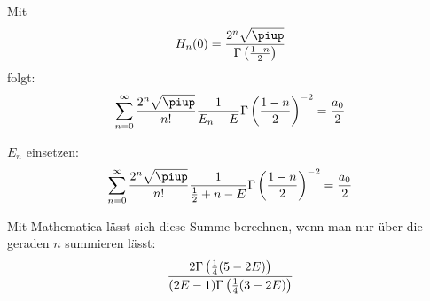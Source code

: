 Mit
\[
    H_n(0) = \frac{2^n \sqrt\piup}{\Gamma\del{\frac{1-n}2}}
\]
folgt:
\[
    \sum_{n=0}^\infty \frac{2^n \sqrt\piup}{n!} \frac{1}{E_n -
    E} \Gamma\del{\frac{1-n}2}^{-2} = \frac{a_0}2
\]

$E_n$ einsetzen:
\[
    \sum_{n=0}^\infty \frac{2^n \sqrt\piup}{n!} \frac{1}{\frac 12 + n -
    E} \Gamma\del{\frac{1-n}2}^{-2} = \frac{a_0}2
\]

Mit Mathematica lässt sich diese Summe berechnen, wenn man nur über die geraden
$n$ summieren lässt:
\[
    \frac{2 \Gamma\del{\frac 14(5-2E)}}{(2E-1)\Gamma\del{\frac 14(3-2E)}}
\]

\begin{figure}[htbp]
    \centering
    \caption{%
    }
    \label{fig:}
\end{figure}

